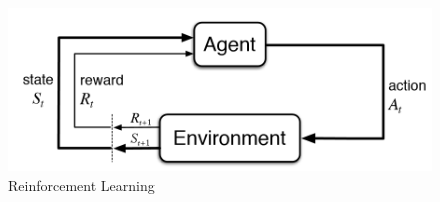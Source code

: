\begin{figure}[!th]
\includegraphics[scale=0.7]{Chapter1/img/RL.png}
\caption{Reinforcement Learning}
\label{fig:rl}
\end{figure}


